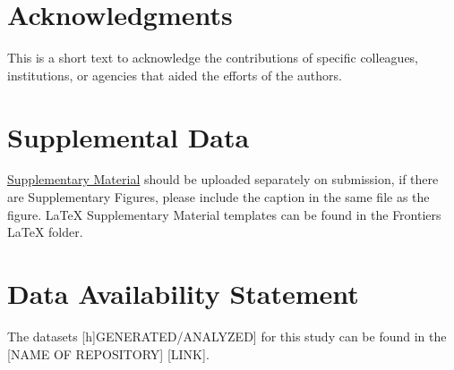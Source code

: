 \documentclass[11pt, oneside]{article}   	%
\begin{document}
\section*{Acknowledgments}
This is a short text to acknowledge the contributions of specific colleagues, institutions, or agencies that aided the efforts of the authors.

\section*{Supplemental Data}
 \href{http://home.frontiersin.org/about/author-guidelines#SupplementaryMaterial}{Supplementary Material} should be uploaded separately on submission, if there are Supplementary Figures, please include the caption in the same file as the figure. LaTeX Supplementary Material templates can be found in the Frontiers LaTeX folder.

\section*{Data Availability Statement}
The datasets [h]GENERATED/ANALYZED] for this study can be found in the [NAME OF REPOSITORY] [LINK].



\end{document}
